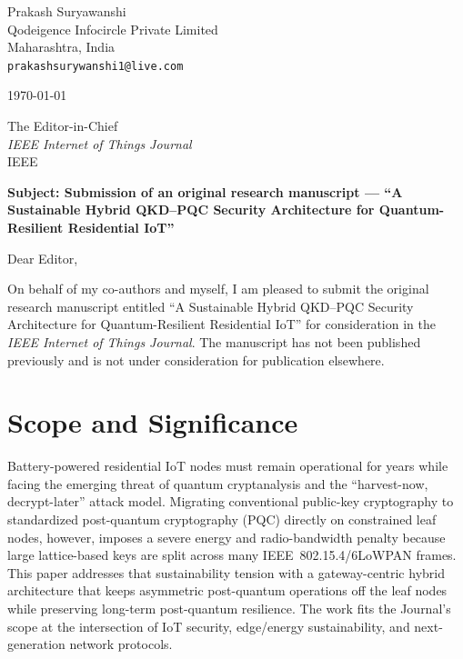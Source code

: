 \documentclass[11pt]{article}
\begin{document}
\begin{flushright}
Prakash Suryawanshi\\
Qodeigence Infocircle Private Limited\\
Maharashtra, India\\
\texttt{prakashsurywanshi1@live.com}
\end{flushright}

\vspace{0.5em}
\today

\vspace{1em}
The Editor-in-Chief\\
\textit{IEEE Internet of Things Journal}\\
IEEE

\vspace{1em}
\textbf{Subject: Submission of an original research manuscript --- ``A Sustainable Hybrid QKD--PQC Security Architecture for Quantum-Resilient Residential IoT''}

\vspace{0.5em}
Dear Editor,

On behalf of my co-authors and myself, I am pleased to submit the original research
manuscript entitled ``A Sustainable Hybrid QKD--PQC Security Architecture for
Quantum-Resilient Residential IoT'' for consideration in the
\emph{IEEE Internet of Things Journal}. The manuscript has not been published
previously and is not under consideration for publication elsewhere.

\section*{Scope and Significance}
Battery-powered residential IoT nodes must remain operational for years while facing
the emerging threat of quantum cryptanalysis and the ``harvest-now, decrypt-later''
attack model. Migrating conventional public-key cryptography to standardized
post-quantum cryptography (PQC) directly on constrained leaf nodes, however, imposes a
severe energy and radio-bandwidth penalty because large lattice-based keys are split
across many IEEE~802.15.4/6LoWPAN frames. This paper addresses that sustainability
tension with a gateway-centric hybrid architecture that keeps asymmetric post-quantum
operations off the leaf nodes while preserving long-term post-quantum resilience. The
work fits the Journal's scope at the intersection of IoT security, edge/energy
sustainability, and next-generation network protocols.
\end{document}
